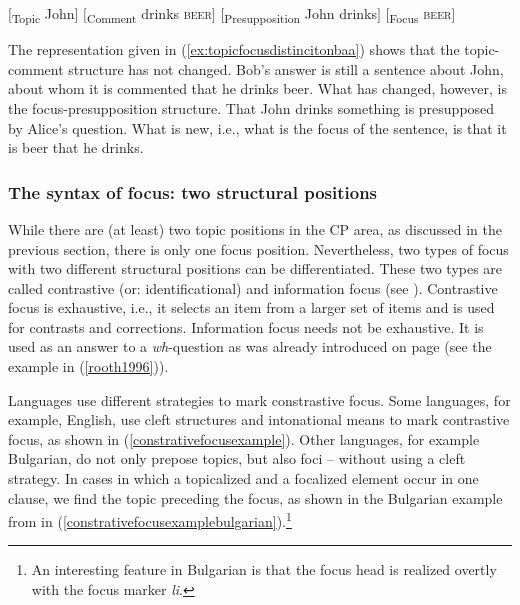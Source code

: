 \begin{exe}
\ex\label{topicfocusdistincitond}\begin{xlist} 
\ex $[$\textsubscript{Topic} John$]$ $[$\textsubscript{Comment} drinks \textsc{beer}$]$ \label{ex:topicfocusdistincitonbaa}
\ex $[$\textsubscript{Presupposition} John drinks$]$ $[$\textsubscript{Focus} \textsc{beer}$]$ \label{ex:topicfocusdistincitonbbb}
\end{xlist}
\end{exe}

\noindent The representation given in (\ref{ex:topicfocusdistincitonbaa}) shows that the topic-comment structure has not changed. Bob's answer is still a sentence about John, about whom it is commented that he drinks beer. What has changed, however, is the focus-pre\-sup\-posi\-tion structure. That John drinks something is presupposed by Alice's question. What is new, i.e., what is the focus of the sentence, is that it is beer that he drinks. 

\subsubsection{The syntax of focus: two structural positions}
While there are (at least) two topic positions in the CP area, as discussed in the previous section, there is only one focus position. Nevertheless, two types of focus with two different structural positions can be differentiated. These two types are called contrastive (or: identificational) and information focus (see \citealt{kiss1981structural}). Contrastive focus is exhaustive, i.e., it selects an item from a larger set of items and is used for contrasts and corrections. Information focus needs not be exhaustive. It is used as an answer to a \textit{wh}-question as was already introduced on page \pageref{rooth1996} (see the example in (\ref{rooth1996})). 

Languages use different strategies to mark constrastive focus. Some languages, for example, English, use cleft structures and intonational means to mark contrastive focus, as shown in (\ref{constrativefocusexample}). Other languages, for example Bulgarian, do not only prepose topics, but also foci -- without using a cleft strategy. In cases in which a topicalized and a focalized element occur in one clause, we find the topic preceding the focus, as shown in the Bulgarian example from \citet[72]{van1995focus} in (\ref{constrativefocusexamplebulgarian}).\footnote{An interesting feature in Bulgarian is that the focus head is realized overtly with the focus marker \textit{li}. }

